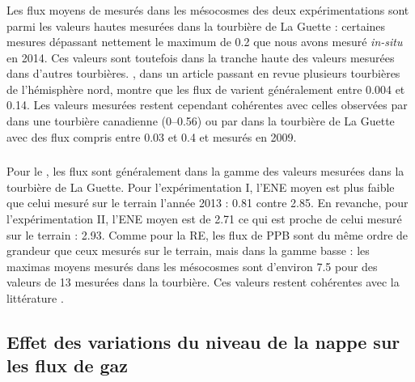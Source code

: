 \subsubsection{\chh}

Les flux moyens de \chh mesurés dans les mésocosmes des deux expérimentations sont parmi les valeurs hautes mesurées dans la tourbière de La Guette : certaines mesures dépassant nettement le maximum de \SI{0.2}{\uml} que nous avons mesuré \textit{in-situ} en 2014.
Ces valeurs sont toutefois dans la tranche haute des valeurs mesurées dans d'autres tourbières.
\citet{blodau2002}, dans un article passant en revue plusieurs tourbières de l'hémisphère nord, montre que les flux de \chh varient généralement entre \num{0.004} et \SI{0.14}{\uml}.
Les valeurs mesurées restent cependant cohérentes avec celles observées par \citet{lai2014} dans une tourbière canadienne (\num{0}--\SI{0.56}{\uml}) ou par \citet{gogo2011} dans la tourbière de La Guette avec des flux compris entre \num{0.03} et \SI{0.4}{\uml} et mesurés en 2009.

\subsubsection{\coo}

Pour le \coo, les flux sont généralement dans la gamme des valeurs mesurées dans la tourbière de La Guette.
Pour l'expérimentation I, l'ENE moyen est plus faible que celui mesuré sur le terrain l'année 2013 : \num{0.81} contre \SI{2.85}{\uml}.
En revanche, pour l'expérimentation II, l'ENE moyen est de \SI{2.71}{\uml} ce qui est proche de celui mesuré sur le terrain : \SI{2.93}{\uml}.
Comme pour la RE, les flux de PPB sont du même ordre de grandeur que ceux mesurés sur le terrain, mais dans la gamme basse : les maximas moyens mesurés dans les mésocosmes sont d'environ \num{7.5} pour des valeurs de \SI{13}{\uml} mesurées dans la tourbière.
Ces valeurs restent cohérentes avec la littérature \citep{bortoluzzi2006a}.

%



\subsection{Effet des variations du niveau de la nappe sur les flux de gaz}

